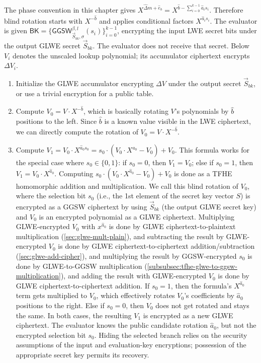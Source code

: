 The phase convention in this chapter gives $X^{\hat\Delta m+\hat e_b}=X^{\hat b-\sum_{i=0}^{k-1}\hat a_i s_i}$. Therefore blind rotation starts with $X^{-\hat b}$ and applies conditional factors $X^{\hat a_i s_i}$. The evaluator is given $\textsf{BK}=\{\textsf{GGSW}_{\vec S_{bk},\sigma}^{\beta,l}(s_i)\}_{i=0}^{k-1}$, encrypting the input LWE secret bits under the output GLWE secret $\vec S_{bk}$. The evaluator does not receive that secret. Below $V_i$ denotes the unscaled lookup polynomial; its accumulator ciphertext encrypts $\Delta V_i$.

\begin{enumerate}
\item Initialize the GLWE accumulator encrypting $\Delta V$ under the output secret $\vec S_{bk}$, or use a trivial encryption for a public table.
\item Compute $V_0 = V \cdot X^{-\hat{b}}$, which is basically rotating $V$'s polynomials by $\hat{b}$ positions to the left. Since $\hat{b}$ is a known value visible in the LWE ciphertext, we can directly compute the rotation of $V_0 = V \cdot X^{-\hat{b}}$. 
\item Compute $V_1 = V_0 \cdot X^{\hat{a}_0s_0} = s_0 \cdot (V_0 \cdot X^{\hat{a}_0} - V_0) + V_0$.  
This formula works for the special case where $s_0 \in \{0, 1\}$: if $s_0 = 0$, then $V_1 = V_0$; else if $s_0 = 1$, then $V_1 = V_0 \cdot X^{\hat{a}_0}$. Computing $s_0 \cdot (V_0 \cdot X^{\hat{a}_0} - V_0) + V_0$ is done as a TFHE homomorphic addition and multiplication. We call this blind rotation of $V_0$, where the selection bit $s_0$ (i.e., the 1st element of the secret key vector $S$) is encrypted as a GGSW ciphertext by using $\vec{S}_{bk}$ (the output GLWE secret key) and $V_0$ is an encrypted polynomial as a GLWE ciphertext. Multiplying GLWE-encrypted $V_0$ with $x^{\hat{a}_0}$ is done by GLWE ciphertext-to-plaintext multiplication (\autoref{sec:glwe-mult-plain}), and subtracting the result by GLWE-encrypted $V_0$ is done by GLWE ciphertext-to-ciphertext addition/subtraction (\autoref{sec:glwe-add-cipher}), and multiplying the result by GGSW-encrypted $s_0$ is done by GLWE-to-GGSW multiplication (\autoref{subsubsec:tfhe-glwe-to-ggsw-multiplication}), and adding the result with GLWE-encrypted $V_0$ is done by GLWE ciphertext-to-ciphertext addition. If $s_0 = 1$, then the formula's $X^{\hat{a}_0}$ term gets multiplied to $V_0$, which effectively rotates $V_0$'s coefficients by $\hat{a}_0$ positions to the right. Else if $s_0 = 0$, then $V_0$ does not get rotated and stays the same. In both cases, the resulting $V_1$ is encrypted as a new GLWE ciphertext. The evaluator knows the public candidate rotation $\hat a_0$, but not the encrypted selection bit $s_0$. Hiding the selected branch relies on the security assumptions of the input and evaluation-key encryptions; possession of the appropriate secret key permits its recovery.

\end{enumerate}
